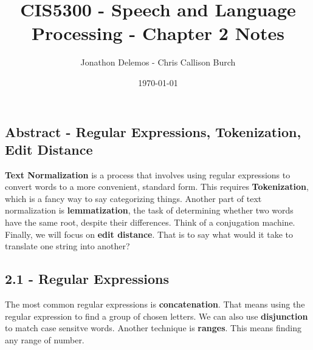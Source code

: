 \documentclass{article}
\title{CIS5300 - Speech and Language Processing - Chapter 2 Notes}
\author{Jonathon Delemos - Chris Callison Burch}
\date{\today}
\begin{document}
\maketitle

\subsection{Abstract - Regular Expressions, Tokenization, Edit Distance}

\textbf{Text Normalization} is a process that involves using regular expressions to convert words to a more convenient, standard form.
This requires \textbf{Tokenization}, which is a fancy way to say categorizing things. Another part of text normalization is
\textbf{lemmatization}, the task of determining whether two words have the same root, despite their differences. Think of a conjugation
machine. Finally, we will focus on \textbf{edit distance}. That is to say what would it take to translate one string into another?

\subsection{ 2.1 - Regular Expressions}

The most common regular expressions is \textbf{concatenation}. That means using the regular expression
to find a group of chosen letters. We can also use \textbf{disjunction} to match case sensitve words. Another technique is \textbf{ranges}. This means finding any range of number.
\end{document}
